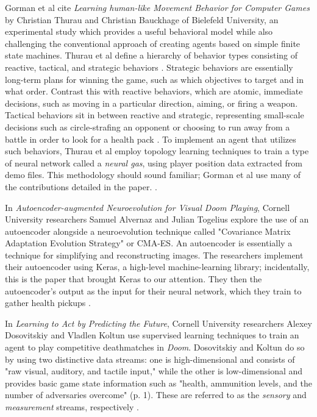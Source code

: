 Gorman et al cite {\it Learning human-like Movement Behavior for Computer Games} by Christian Thurau and Christian Bauckhage of Bielefeld University, an experimental study which provides a useful behavioral model while also challenging the conventional approach of creating agents based on simple finite state machines. Thurau et al define a hierarchy of behavior types consisting of reactive, tactical, and strategic behaviors \cite{Thurau:2004}. Strategic behaviors are essentially long-term plans for winning the game, such as which objectives to target and in what order. Contrast this with reactive behaviors, which are atomic, immediate decisions, such as moving in a particular direction, aiming, or firing a weapon. Tactical behaviors sit in between reactive and strategic, representing small-scale decisions such as circle-strafing an opponent or choosing to run away from a battle in order to look for a health pack \cite{Gorman:2006}. To implement an agent that utilizes such behaviors, Thurau et al employ topology learning techniques to train a type of neural network called a {\it neural gas}, using player position data extracted from demo files. This methodology should sound familiar; Gorman et al use many of the contributions detailed in the paper.  \cite{Thurau:2004}.

In {\it Autoencoder-augmented Neuroevolution for Visual Doom Playing}, Cornell University researchers Samuel Alvernaz and Julian Togelius explore the use of an autoencoder alongside a neuroevolution technique called "Covariance Matrix Adaptation Evolution Strategy" or CMA-ES. An autoencoder is essentially a technique for simplifying and reconstructing images. The researchers implement their autoencoder using Keras, a high-level machine-learning library; incidentally, this is the paper that brought Keras to our attention. They then the autoencoder's output as the input for their neural network, which they train to gather health pickups \cite{Alvernaz:2017}.

In {\it Learning to Act by Predicting the Future}, Cornell University researchers Alexey Dosovitskiy and Vladlen Koltun use supervised learning techniques to train an agent to play competitive deathmatches in {\it Doom}. Dosovitskiy and Koltun do so by using two distinctive data streams: one is high-dimensional and consists of "raw visual, auditory, and tactile input," while the other is low-dimensional and provides basic game state information such as "health, ammunition levels, and the number of adversaries overcome" (p. 1). These are referred to as the {\it sensory} and {\it measurement} streams, respectively \cite{Dosovitskiy:2016}.


